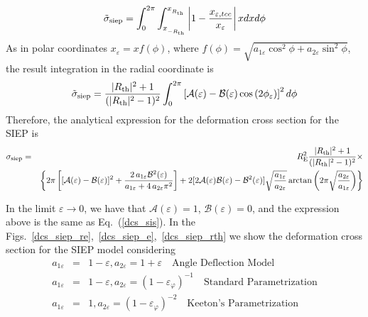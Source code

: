 \begin{equation}
\tilde{\sigma}_{\rm siep}= \int_{0}^{2\pi}\int_{x_{_{-R_{\rm th}}}}^{x_{_{R_{\rm th}}}}\left| 1-\dfrac{x_{\varepsilon,tcc}}{x_{\varepsilon}}\right| x dx d\phi 
\end{equation}
As in polar coordinates $x_{\varepsilon}=xf(\phi)$, where $f(\phi)=\sqrt{a_{1\varepsilon}\cos^2{\phi}+a_{2\varepsilon}\sin^2{\phi}}$, the result integration in the radial coordinate is
\begin{equation}
\tilde{\sigma}_{\rm siep}= \dfrac{|R_{\rm th}|^2+1}{(|R_{\rm th}|^2-1)^2}
\int_{0}^{2\pi}\left[\mathcal{A}(\varepsilon)-\mathcal{B}(\varepsilon)\cos{
(2\phi_\varepsilon)} \right]^2 d\phi 
\end{equation}
Therefore, the analytical expression for the deformation cross section for the SIEP is
\begin{eqnarray}
\sigma_{\rm siep}&=& R^2_{\rm E}\dfrac{|R_{\rm th}|^2+1}{(|R_{\rm th}|^2-1)^2}\times \nonumber \\
& & \left\{2\pi\left[ [\mathcal{A}(\varepsilon)-\mathcal{B}(\varepsilon)]^2+\frac{2\,a_{1\varepsilon}\mathcal{B}^2(\varepsilon)}{a_{1\varepsilon}+4\,a_{2\varepsilon}\pi^{2}} \right]+ 2[2\mathcal{A}(\varepsilon)\mathcal{B}(\varepsilon)-\mathcal{B}^2(\varepsilon)]\sqrt{\frac{a_{1\varepsilon}}{a_{2\varepsilon}}}\arctan{\left( 2\pi\sqrt{\frac{a_{2\varepsilon}}{a_{1\varepsilon}}}\right)} \right\} \nonumber \\
\end{eqnarray}

In the limit $\varepsilon \rightarrow 0$, we have that $\mathcal{A}(\varepsilon)=1$, $\mathcal{B}(\varepsilon)=0$,  and the expression
above is the same as Eq.~(\ref{dcs_sis}). In the Figs.~\ref{dcs_siep_re},~\ref{dcs_siep_e},~\ref{dcs_siep_rth} we show the
deformation cross section for the SIEP model considering 
\begin{eqnarray}
 a_{1\varepsilon}&=&1-\varepsilon, a_{2\varepsilon}=1+\varepsilon \quad
\textrm{Angle Deflection Model} \\ 
a_{1\varepsilon} &=&1-\varepsilon,a_{2\varepsilon}=(1-\varepsilon_\varphi)^{-1} 
\quad
\textrm{Standard Parametrization} \\
a_{1\varepsilon} &=& 1, a_{2\varepsilon}=(1-\varepsilon_\varphi)^{-2}
\quad
\textrm{Keeton's Parametrization} 
\end{eqnarray}



